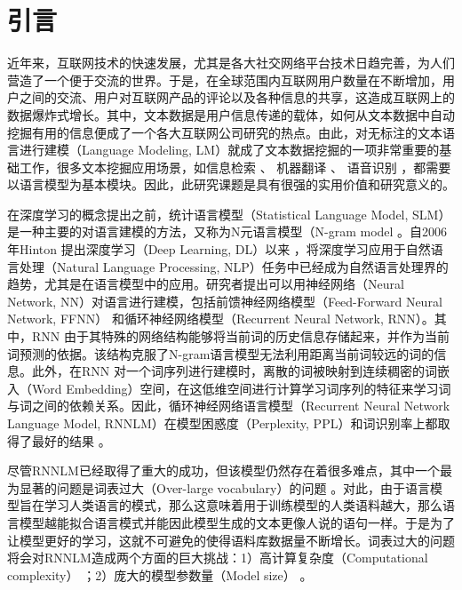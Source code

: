 \documentclass[12pt,a4paper]{article}
\begin{document}
\section{引言}
\label{sec:intro}
近年来，互联网技术的快速发展，尤其是各大社交网络平台技术日趋完善，为人们营造了一个便于交流的世界。于是，在全球范围内互联网用户数量在不断增加，用户之间的交流、用户对互联网产品的评论以及各种信息的共享，这造成互联网上的数据爆炸式增长。其中，文本数据是用户信息传递的载体，如何从文本数据中自动挖掘有用的信息便成了一个各大互联网公司研究的热点。由此，对无标注的文本语言进行建模（Language Modeling, LM）就成了文本数据挖掘的一项非常重要的基础工作，很多文本挖掘应用场景，如信息检索 \cite{Jin:2002:TLM:564376.564386}、 机器翻译 \cite{DBLP:conf/naacl/BaltescuB15}、 语音识别 \cite{DBLP:conf/interspeech/SakSB14}，都需要以语言模型为基本模块。因此，此研究课题是具有很强的实用价值和研究意义的。

在深度学习的概念提出之前，统计语言模型（Statistical Language Model, SLM） 是一种主要的对语言建模的方法，又称为N元语言模型（N-gram model \cite{DBLP:journals/csl/ChenG99}。自2006 年Hinton 提出深度学习（Deep Learning, DL）以来 \cite{hinton2006reducing}，将深度学习应用于自然语言处理（Natural Language Processing, NLP）任务中已经成为自然语言处理界的趋势，尤其是在语言模型中的应用。研究者提出可以用神经网络（Neural Network, NN）对语言进行建模，包括前馈神经网络模型（Feed-Forward Neural Network, FFNN）\cite{DBLP:conf/nips/BengioDV00} 和循环神经网络模型（Recurrent Neural Network, RNN）\cite{DBLP:conf/interspeech/MikolovKBCK10}。其中，RNN 由于其特殊的网络结构能够将当前词的历史信息存储起来，并作为当前词预测的依据。该结构克服了N-gram语言模型无法利用距离当前词较远的词的信息。此外，在RNN 对一个词序列进行建模时，离散的词被映射到连续稠密的词嵌入（Word Embedding）空间，在这低维空间进行计算学习词序列的特征来学习词与词之间的依赖关系。因此，循环神经网络语言模型（Recurrent Neural Network Language Model, RNNLM）在模型困惑度（Perplexity, PPL）和词识别率上都取得了最好的结果 \cite{DBLP:conf/icassp/MikolovKBCK11}。

尽管RNNLM已经取得了重大的成功，但该模型仍然存在着很多难点，其中一个最为显著的问题是词表过大（Over-large vocabulary）的问题 \cite{DBLP:conf/interspeech/ChenWLGW14}。对此，由于语言模型旨在学习人类语言的模式，那么这意味着用于训练模型的人类语料越大，那么语言模型越能拟合语言模式并能因此模型生成的文本更像人说的语句一样。于是为了让模型更好的学习，这就不可避免的使得语料库数据量不断增长。词表过大的问题将会对RNNLM造成两个方面的巨大挑战：1）高计算复杂度（Computational complexity） \cite{DBLP:conf/acl/ChenGA16}；2）庞大的模型参数量（Model size） \cite{DBLP:conf/nips/LiQYHL16}。
\end{document}
